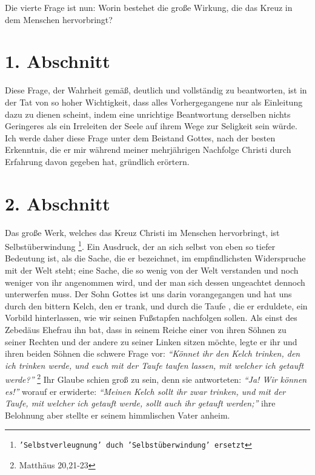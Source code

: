 Die vierte Frage ist nun: Worin bestehet die große Wirkung, die das Kreuz in dem
Menschen hervorbringt?

\section{1. Abschnitt} \label{kap4_ab1}

Diese Frage, der Wahrheit gemäß, deutlich und vollständig zu beantworten, ist in
der Tat von so hoher Wichtigkeit, dass alles Vorhergegangene nur als Einleitung
dazu zu dienen scheint, indem eine unrichtige Beantwortung derselben nichts
Geringeres als ein Irreleiten der Seele auf ihrem Wege zur Seligkeit sein würde.
Ich werde daher diese Frage unter dem Beistand Gottes, nach der besten
Erkenntnis, die er mir während meiner mehrjährigen Nachfolge Christi durch
Erfahrung davon gegeben hat, gründlich erörtern.

\section{2. Abschnitt} \label{kap4_ab2}

Das große Werk, welches das Kreuz Christi im Menschen hervorbringt, ist
Selbstüberwindung \footnote{\texttt{'Selbstverleugnung' duch 'Selbstüberwindung'
ersetzt}}. Ein Ausdruck, der an sich selbst von eben so tiefer Bedeutung
ist, als die Sache, die er bezeichnet, im empfindlichsten Widerspruche mit der
Welt steht; eine Sache, die so wenig von der Welt verstanden und noch weniger
von ihr angenommen wird, und der man sich dessen ungeachtet dennoch unterwerfen
muss. Der Sohn Gottes ist uns darin vorangegangen und hat uns durch den bittern
Kelch, den er trank, und durch die Taufe , die er erduldete, ein
Vorbild
hinterlassen, wie wir seinen Fußstapfen nachfolgen sollen. Als einst des
Zebedäus Ehefrau  ihn bat, dass in seinem
Reiche einer von ihren Söhnen zu
seiner Rechten und der andere zu seiner Linken sitzen möchte, legte er ihr und
ihren beiden Söhnen die schwere Frage vor:
\textit{"`Könnet ihr den Kelch trinken, den
ich trinken werde, und euch mit der Taufe taufen lassen, mit welcher ich
getauft werde?"'}
\footnote{Matthäus  20,21-23}
Ihr Glaube schien groß zu sein, denn
sie antworteten:\textit{ "`Ja! Wir können es!"'} worauf er erwiderte:
  \textit{"`Meinen Kelch
sollt ihr zwar trinken, und mit der Taufe, mit welcher ich getauft werde, sollt
auch ihr getauft werden;"'} ihre Belohnung aber stellte er seinem himmlischen
Vater anheim.

